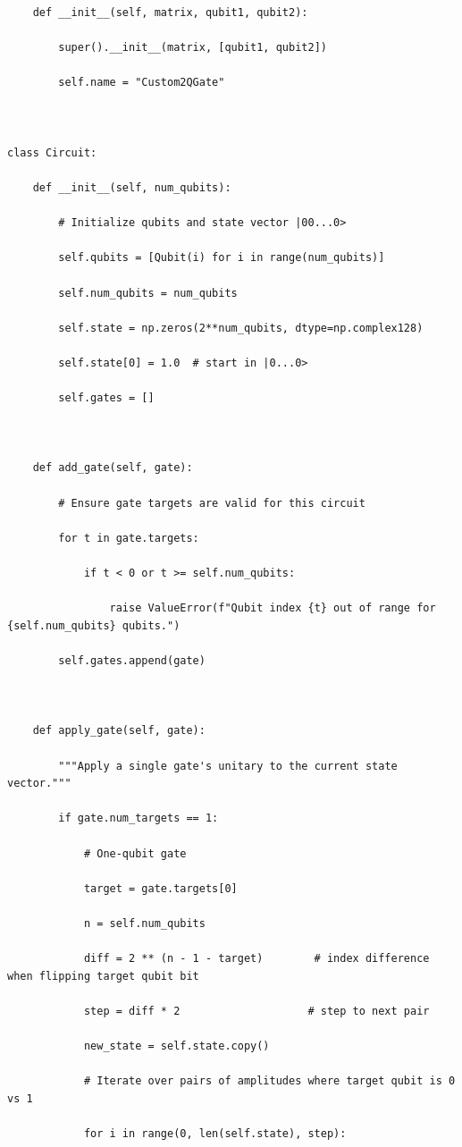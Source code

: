 \documentclass{beamer}
\begin{document}
\begin{frame}
\begin{verbatim}
    def __init__(self, matrix, qubit1, qubit2):

        super().__init__(matrix, [qubit1, qubit2])

        self.name = "Custom2QGate"



class Circuit:

    def __init__(self, num_qubits):

        # Initialize qubits and state vector |00...0>

        self.qubits = [Qubit(i) for i in range(num_qubits)]

        self.num_qubits = num_qubits

        self.state = np.zeros(2**num_qubits, dtype=np.complex128)

        self.state[0] = 1.0  # start in |0...0>

        self.gates = []



    def add_gate(self, gate):

        # Ensure gate targets are valid for this circuit

        for t in gate.targets:

            if t < 0 or t >= self.num_qubits:

                raise ValueError(f"Qubit index {t} out of range for {self.num_qubits} qubits.")

        self.gates.append(gate)



    def apply_gate(self, gate):

        """Apply a single gate's unitary to the current state vector."""

        if gate.num_targets == 1:

            # One-qubit gate

            target = gate.targets[0]

            n = self.num_qubits

            diff = 2 ** (n - 1 - target)        # index difference when flipping target qubit bit

            step = diff * 2                    # step to next pair

            new_state = self.state.copy()

            # Iterate over pairs of amplitudes where target qubit is 0 vs 1

            for i in range(0, len(self.state), step):


\end{verbatim}
\end{frame}
\end{document}
